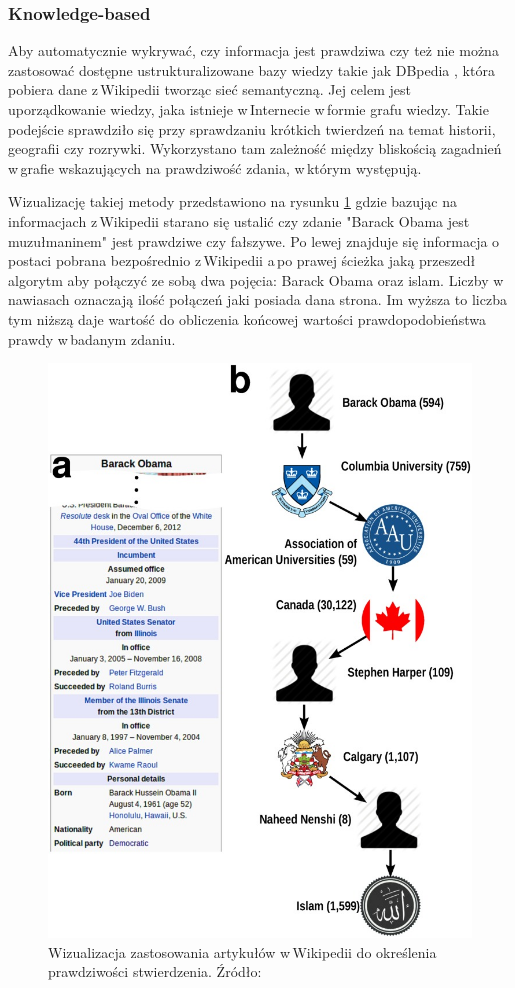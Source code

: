 \subsubsection{Knowledge-based}
Aby automatycznie wykrywać, czy informacja jest prawdziwa czy też nie można zastosować dostępne ustrukturalizowane bazy wiedzy takie jak DBpedia , która pobiera dane z\,Wikipedii tworząc sieć semantyczną. Jej celem jest uporządkowanie wiedzy, jaka istnieje w\,Internecie w\,formie grafu wiedzy.  Takie podejście sprawdziło się przy sprawdzaniu krótkich twierdzeń na temat historii, geografii czy rozrywki\cite{ciampaglia2015computational}. Wykorzystano tam zależność między bliskością zagadnień w\,grafie wskazujących na prawdziwość zdania, w\,którym występują.
\par 
Wizualizację takiej metody przedstawiono na rysunku \ref{fig:barackObama} gdzie bazując na informacjach z\,Wikipedii starano się ustalić czy zdanie "Barack Obama jest muzułmaninem" jest prawdziwe czy fałszywe. Po lewej znajduje się informacja o postaci pobrana bezpośrednio z\,Wikipedii a\,po prawej ścieżka jaką przeszedł algorytm aby połączyć ze sobą dwa pojęcia: Barack Obama oraz islam. Liczby w\,nawiasach oznaczają ilość połączeń jaki posiada dana strona. Im wyższa to liczba tym niższą daje wartość do obliczenia końcowej wartości prawdopodobieństwa prawdy w\,badanym zdaniu. 

\begin{figure}[!h]
	\centering \includegraphics[width=0.5\linewidth]{img/barackObamaIsAMuslimNew.jpg}
	\caption{Wizualizacja zastosowania artykułów w\,Wikipedii do określenia prawdziwości stwierdzenia. Źródło: \cite{ciampaglia2015computational}}
	\label{fig:barackObama}
\end{figure}
\par

